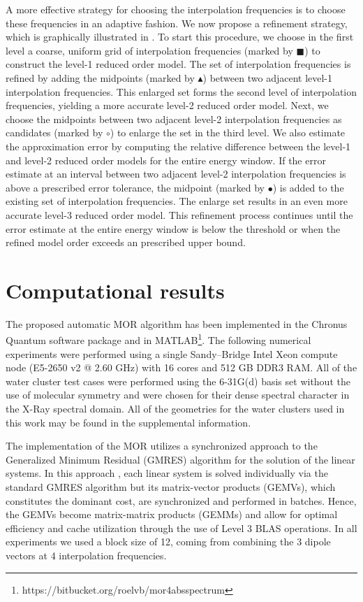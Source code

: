 A more effective strategy for choosing the interpolation frequencies is to choose these frequencies in an adaptive fashion. We now propose a refinement strategy, which is graphically illustrated in . To start this procedure, we choose in the first level a coarse, uniform grid of interpolation frequencies (marked by {\scriptsize$\blacksquare$}) to construct the level-1 reduced order model. The set of interpolation frequencies is refined by adding the midpoints (marked by {\footnotesize$\blacktriangle$}) between two adjacent level-1 interpolation frequencies. This enlarged set forms the second level of interpolation frequencies, yielding a more accurate level-2 reduced order model. Next, we choose the midpoints between two adjacent level-2 interpolation frequencies as candidates (marked by $\circ$) to enlarge the set in the third level. We also estimate the approximation error by computing the relative difference between the level-1 and level-2 reduced order models for the entire energy window. If the error estimate at an interval between two adjacent level-2 interpolation frequencies is above a prescribed error tolerance, the midpoint (marked by $\bullet$) is added to the existing set of interpolation frequencies. The enlarge set results in an even more accurate level-3 reduced order model. This refinement process continues until the error estimate at the entire energy window is below the threshold or when the refined model order exceeds an prescribed upper bound.

\section{Computational results}
\label{sec:MORresults}

The proposed automatic MOR algorithm has been implemented in the Chronus
Quantum software package\cite{chronusq_beta2} and in
MATLAB\footnote[4]{https://bitbucket.org/roelvb/mor4absspectrum}.
The following numerical experiments were performed using a single
Sandy--Bridge Intel Xeon compute node (E5-2650 v2 @ 2.60 GHz) with 16
cores and 512 GB DDR3 RAM. All of the water cluster test cases were performed
using the 6-31G(d) basis set without the use of molecular symmetry and
were chosen for their dense spectral character in the X-Ray spectral domain.
All of the geometries for the water clusters used in this work may be
found in the supplemental information.

The implementation of the MOR utilizes a synchronized approach to the
Generalized Minimum Residual (GMRES)\cite{Walker88_152} algorithm for the
solution of the linear systems. In this approach \cite{shak2016}, each linear
system is solved individually via the standard GMRES algorithm but its
matrix-vector products (GEMVs), which constitutes the dominant cost, are synchronized
and performed in batches. Hence, the GEMVs become matrix-matrix
products (GEMMs) and allow for optimal efficiency and cache utilization through
the use of Level 3 BLAS operations. In all experiments we used a block size of
12, coming from combining the 3 dipole vectors at 4 interpolation frequencies.

